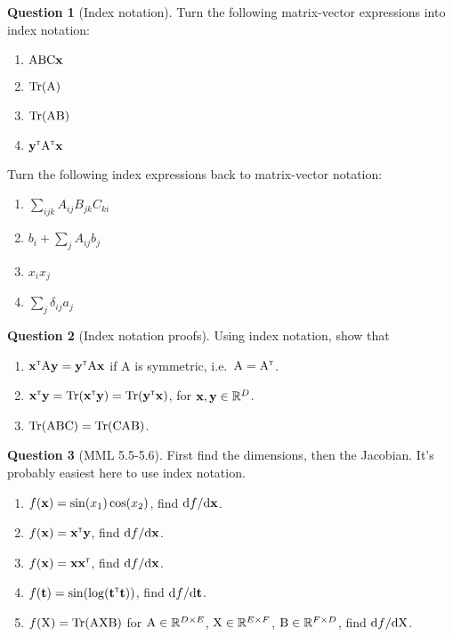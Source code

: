 \documentclass[a4paper]{article}
\newcommand{\mat}[1]{{\mathrm{{#1}}}} %
\theoremstyle{definition}
\newtheorem{question}{Question}
\begin{document}
\begin{question}[Index notation] Turn the following matrix-vector expressions into index notation:
\begin{multicols}{2}
\begin{enumerate}[label=\alph*.]
\item $\mat A \mat B \mat C \vx$
\item $\Tr(\mat A)$
\item $\Tr(\mat A \mat B)$
\item $\vy\transpose \mat A\transpose \vx$
\end{enumerate}
\end{multicols}
Turn the following index expressions back to matrix-vector notation:
\begin{multicols}{2}
\begin{enumerate}[label=\alph*.]
\item $\sum_{ijk} A_{ij}B_{jk}C_{ki}$
\item $b_i + \sum_j A_{ij}b_j$
\item $x_ix_j$
\item $\sum_j \delta_{ij}a_j$
\end{enumerate}
\end{multicols}
\end{question}

\begin{question}[Index notation proofs]
Using index notation, show that
\begin{enumerate}
\item $\vx\transpose \mat A\vy = \vy\transpose \mat A\vx$ if $\mat A$ is symmetric, i.e.~$\mat A = \mat A\transpose$.
\item $\mathbf{x}^\mathrm{\textsf{\tiny T}}\mathbf{y} = \operatorname{Tr}(\mathbf{x}^\mathrm{\textsf{\tiny T}}\mathbf{y}) = \operatorname{Tr}(\mathbf{y}^\mathrm{\textsf{\tiny T}}\mathbf{x})$, for $\mathbf{x},\mathbf{y}\in\mathbb{R}^D$.
\item $\Tr(\mat A\mat B\mat C) = \Tr(\mat C\mat A\mat B)$.
\end{enumerate}
\end{question}

\begin{question}[MML 5.5-5.6]
First find the dimensions, then the Jacobian. It's probably easiest here to use index notation.
\begin{enumerate}[label=\alph*.]
\item $f(\mathbf{x}) = \sin(x_1)\cos(x_2)$, find $\mathrm{d} f/\mathrm{d}\mathbf{x}$.
\item $f(\mathbf{x}) = \mathbf{x}^\mathrm{\textsf{\tiny T}}\mathbf{y}$, find $\mathrm{d} f/\mathrm{d}\mathbf{x}$.
\item $f(\mathbf{x}) = \mathbf{x}\mathbf{x}^\mathrm{\textsf{\tiny T}}$, find $\mathrm{d} f/\mathrm{d}\mathbf{x}$.
\item $f(\mathbf{t}) = \sin(\log(\mathbf{t}^\mathrm{\textsf{\tiny T}}\mathbf{t}))$, find $\mathrm{d} f/\mathrm{d}\mathbf{t}$.
\item $f(\mat X) = \Tr(\mat A \mat X \mat B)$ for $\mat A \in \Reals^{D\times E}$, $\mat X \in \Reals^{E\times F}$, $\mat B \in \Reals^{F\times D}$, find $\calcd f/\calcd\mat X$.
\end{enumerate}
\end{question}
\end{document}
